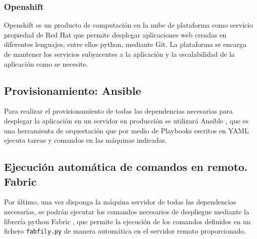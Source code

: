 \subsubsection{Openshift}
Openshift \cite{Openshift} es un producto de computación en la nube de plataforma como servicio propiedad de Red Hat que permite desplegar aplicaciones web creadas en diferentes lenguajes, entre ellos python, mediante Git. La plataforma se encarga de mantener los servicios subyacentes a la aplicación y la escalabilidad de la aplicación como se necesite. 

\subsection{Provisionamiento: Ansible}
Para realizar el provisionamiento de todas las dependencias necesarias para desplegar la aplicación en un servidor en producción se utilizará Ansible \cite{Ansible}, que es una herramienta de orquestación que por medio de Playbooks escritos en YAML \cite{YAML} ejecuta tareas y comandos en las máquinas indicadas.

\subsection{Ejecución automática de comandos en remoto. Fabric}
Por último, una vez disponga la máquina servidor de todas las dependencias necesarias, se podrán ejecutar los comandos necesarios de despliegue mediante la librería python Fabric \cite{Fabric}, que permite la ejecución de los comandos definidos en un fichero \texttt{fabfily.py} de manera automática en el servidor remoto proporcionado.

